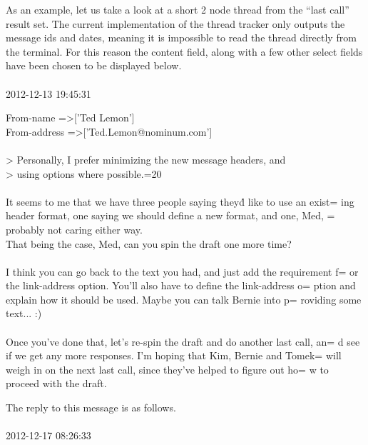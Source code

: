 \documentclass[a4paper,english]{report}
\begin{document}
As an example, let us take a look at a short 2 node thread from the “last call” result set.
The current implementation of the thread tracker only outputs the message ids and dates, meaning it is impossible to read the thread directly from the terminal. For this reason the content field, along with a few other select fields have been chosen to be displayed below.\\\\





2012-12-13 19:45:31 

\begin{displayquote}
\noindent
From-name =>['Ted Lemon']\\
From-address =>['Ted.Lemon@nominum.com']\\\\



\noindent
> Personally, I prefer minimizing the new message headers, and\\
> using options where possible.=20\\\\
\noindent
It seems to me that we have three people saying they\'d like to use an exist=
ing header format, one saying we should define a new format, and one, Med, =
probably not caring either way.\\
\noindent
That being the case, Med, can you spin the draft one more time?\\\\
\noindent
I think you can go back to the text you had, and just add the requirement f=
or the link-address option.   You'll also have to define the link-address o=
ption and explain how it should be used.   Maybe you can talk Bernie into p=
roviding some text... :)\\\\
\noindent
Once you've done that, let's re-spin the draft and do another last call, an=
d see if we get any more responses.   I'm hoping that Kim, Bernie and Tomek=
 will weigh in on the next last call, since they've helped to figure out ho=
w to proceed with the draft.

\end{displayquote}

The reply to this message is as follows.\\\\




2012-12-17 08:26:33
\end{document}
